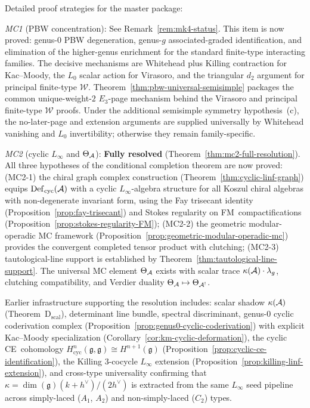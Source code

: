 \begin{remark}\label{rem:proof-roadmaps}
Detailed proof strategies for the master package:

\emph{MC1} (PBW concentration):
See Remark~\ref{rem:mk4-status}.  This item is now proved:
genus-$0$ PBW degeneration, genus-$g$ associated-graded
identification, and elimination of the higher-genus enrichment for the
standard finite-type interacting families.  The decisive mechanisms are
Whitehead plus Killing contraction for Kac--Moody, the $L_0$ scalar
action for Virasoro, and the triangular $d_2$ argument for principal
finite-type $\mathcal{W}$.
Theorem~\ref{thm:pbw-universal-semisimple} packages the common
unique-weight-$2$ $E_3$-page mechanism behind the Virasoro and
principal finite-type $\mathcal{W}$ proofs.  Under the additional
semisimple symmetry hypothesis~(c), the no-later-page and extension
arguments are supplied universally by Whitehead vanishing and $L_0$
invertibility; otherwise they remain family-specific.

\emph{MC2} (cyclic $L_\infty$ and $\Theta_{\mathcal{A}}$):
\textbf{Fully resolved}
(Theorem~\ref{thm:mc2-full-resolution}).
All three hypotheses of the conditional completion
theorem are now proved:
\textup{(MC2-1)} the chiral graph complex construction
(Theorem~\ref{thm:cyclic-linf-graph}) equips
$\operatorname{Def}_{\mathrm{cyc}}(\mathcal{A})$ with a cyclic $L_\infty$-algebra structure
for all Koszul chiral algebras with non-degenerate invariant
form, using the Fay trisecant identity
(Proposition~\ref{prop:fay-trisecant}) and Stokes regularity
on FM~compactifications
(Proposition~\ref{prop:stokes-regularity-FM});
\textup{(MC2-2)} the geometric modular-operadic MC framework
(Proposition~\ref{prop:geometric-modular-operadic-mc}) provides
the convergent completed tensor product with clutching;
\textup{(MC2-3)} tautological-line support is established by
Theorem~\ref{thm:tautological-line-support}.
The universal MC element $\Theta_{\mathcal{A}}$ exists with scalar trace
$\kappa(\mathcal{A})\cdot\lambda_g$, clutching compatibility, and Verdier
duality $\Theta_{\mathcal{A}}\mapsto\Theta_{\mathcal{A}^!}$.

Earlier infrastructure supporting the resolution includes: scalar shadow
$\kappa(\mathcal{A})$ (Theorem~D$_{\mathrm{scal}}$), determinant line bundle,
spectral discriminant, genus-$0$ cyclic coderivation complex
(Proposition~\ref{prop:genus0-cyclic-coderivation}) with explicit
Kac--Moody specialization
(Corollary~\ref{cor:km-cyclic-deformation}),
the cyclic CE~cohomology
$H^n_{\mathrm{cyc}}(\mathfrak{g},\mathfrak{g})\cong H^{n+1}(\mathfrak{g})$
(Proposition~\ref{prop:cyclic-ce-identification}),
the Killing $3$-cocycle $L_\infty$ extension
(Proposition~\ref{prop:killing-linf-extension}),
and cross-type universality confirming that
$\kappa = \dim(\mathfrak{g})(k+h^\vee)/(2h^\vee)$
is extracted from the same $L_\infty$ seed pipeline across
simply-laced ($A_1$, $A_2$) and non-simply-laced ($C_2$) types.


\end{remark}
